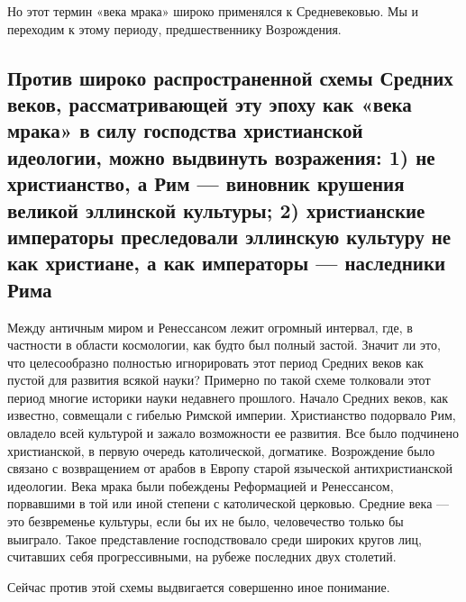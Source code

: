 Но этот термин «века мрака» широко применялся к Средневековью. Мы и
переходим к этому периоду, предшественнику Возрождения.

\subsection{Против широко распространенной схемы Средних веков,
рассматривающей эту эпоху как «века мрака» в силу господства
христианской идеологии, можно выдвинуть возражения: 1) не
христианство, а Рим --- виновник крушения великой эллинской культуры;
2) христианские императоры преследовали эллинскую культуру не как
христиане, а как императоры --- наследники Рима}

Между античным миром и Ренессансом лежит огромный интервал, где, в
частности в области космологии, как будто был полный застой. Значит
ли это, что целесообразно полностью игнорировать этот период Средних
веков как пустой для развития всякой науки? Примерно по такой схеме
толковали этот период многие историки науки недавнего прошлого.
Начало Средних веков, как известно, совмещали с гибелью Римской
империи. Христианство подорвало Рим, овладело всей культурой и зажало
возможности ее развития. Все было подчинено христианской, в первую
очередь католической, догматике. Возрождение было связано с
возвращением от арабов в Европу старой языческой антихристианской
идеологии. Века мрака были побеждены Реформацией и Ренессансом,
порвавшими в той или иной степени с католической церковью. Средние
века --- это безвременье культуры, если бы их не было, человечество
только бы выиграло. Такое представление господствовало среди широких
кругов лиц, считавших себя прогрессивными, на рубеже последних двух
столетий.

Сейчас против этой схемы выдвигается совершенно иное понимание.

